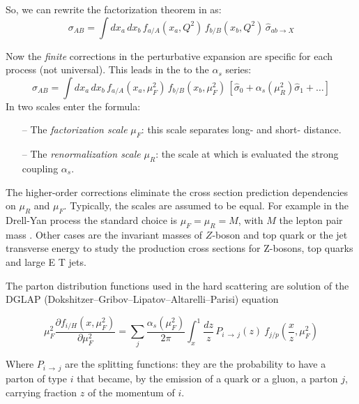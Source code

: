 So, we can rewrite the factorization theorem in  as:
\begin{equation}
	\sigma_{AB}=\displaystyle\int dx_a\,dx_b\,f_{a/A}(x_a,Q^2)\,f_{b/B}(x_b,Q^2)\,\hat{\sigma}_{ab \rightarrow X}
\label{eq:factorization2}
\end{equation}

Now the \emph{finite} corrections in the perturbative expansion are specific for each process (not universal). This leads in the  to the $\alpha_s$ series:
\begin{equation}
	\sigma_{AB}=\displaystyle\int dx_a\,dx_b\,f_{a/A}(x_a,\mu_F^2)\,f_{b/B}(x_b,\mu_F^2)\,\left[\hat{\sigma}_0+\alpha_s(\mu_R^2)\hat{\sigma}_1+\dots\right]
\label{eq:factorization3}
\end{equation}
In  two scales enter the formula:
\begin{itemize}
	\item[--] The \textit{factorization scale} $\mu_F$: this scale separates long- and short- distance.
	\item[--] The \textit{renormalization scale} $\mu_R$: the scale at which is evaluated the strong coupling $\alpha_s$.  
\end{itemize}

The higher-order corrections eliminate the cross section prediction dependencies on $\mu_R$ and $\mu_F$.
Typically, the scales are assumed to be equal.
For example in the Drell-Yan process the standard choice is $\mu_F=\mu_R=M$, with $M$ the lepton pair mass \cite{Campbell2006}. Other cases are the invariant masses of $Z$-boson and top quark or the jet transverse energy to study \cite{Campbell2006} the production cross sections for Z-bosons, top quarks and large E T jets.

The parton distribution functions used in the hard scattering are solution of the DGLAP (Dokshitzer–Gribov–Lipatov–Altarelli–Parisi) equation \cite{Lipatov:400357, Gribov:427157, ALTARELLI1977298, Dokshitzer:1977sg}

\begin{equation}
	\mu_F^2\frac{\partial f_{i/H}(x,\mu_F^2)}{\partial\mu_F^2}=\displaystyle\sum_j\frac{\alpha_s(\mu_F^2)}{2\pi}\displaystyle\int_x^1 \frac{dz}{z}\, P_{i\,\rightarrow\,j}(z)\ f_{j/p}\left(\frac{x}{z},\mu_F^2\right)
\end{equation}

Where $P_{i\,\rightarrow\,j}$ are the splitting functions: they are the probability to have a parton of type $i$ that became, by the emission of a quark or a gluon, a parton $j$, carrying fraction $z$ of the momentum of $i$.

